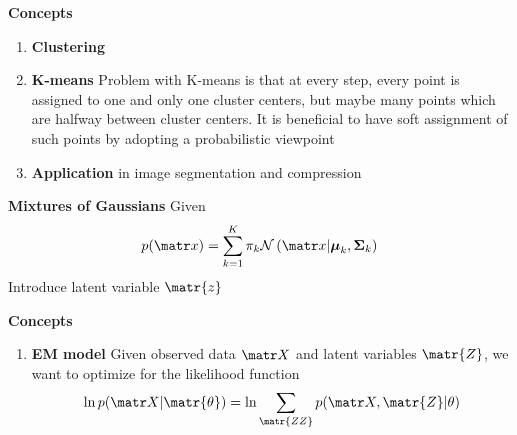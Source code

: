 \documentclass[11pt]{article}
\begin{document}

\begin{defn*}
    \textbf{Concepts}
    \begin{enumerate}
        \item \textbf{Clustering} 
        \item \textbf{K-means} Problem with K-means is that at every step, every point is assigned to one and only one cluster centers, but maybe many points which are halfway between cluster centers. It is beneficial to have soft assignment of such points by adopting a probabilistic viewpoint
        \item \textbf{Application} in image segmentation and compression
    \end{enumerate}
\end{defn*}



\begin{defn*}
    \textbf{Mixtures of Gaussians} Given 
    \[
        p(\bx) = \sum_{k=1}^K \pi_k \normal{\bx | \bmu_k, \boldsymbol{\Sigma}_k}    
    \]
    Introduce latent variable $\matr{z}$ 
\end{defn*}



\begin{defn*}
    \textbf{Concepts}
    \begin{enumerate}
        \item \textbf{EM model} Given observed data $\bX$ and latent variables $\matr{Z}$, we want to optimize for the likelihood function
        \[
            \ln{p(\bX | \matr{\theta})} = \ln{\sum_{\matr{ZZ}} p(\bX, \matr{Z} | \theta)}
        \]
    \end{enumerate}
\end{defn*}
\end{document}
